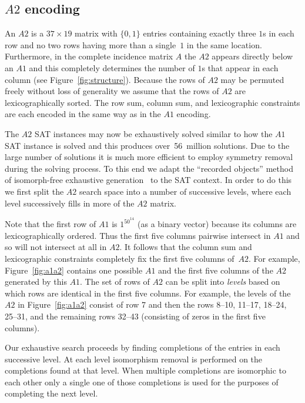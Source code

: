 \documentclass[letterpaper]{article}
\begin{document}
\subsection{\boldmath$A2$ encoding}\label{subsec:a2}

An $A2$ is a $37\times19$ matrix with $\{0,1\}$ entries containing exactly
three $1$s in each row and no two rows having more than
a single~$1$ in the same location.  Furthermore, in the complete incidence matrix $A$ the $A2$ appears
directly below an $A1$ and this completely determines the number of $1$s
that appear in each column (see Figure~\ref{fig:structure}).
Because the rows of $A2$ may be permuted freely without loss of generality
we assume that the rows of $A2$ are lexicographically sorted.
The row sum, column sum, and lexicographic constraints are each encoded
in the same way as in the $A1$ encoding.

The $A2$ SAT instances may now be exhaustively solved
similar to how the $A1$ SAT instance is solved and this
produces over~56~million solutions.
Due to the large number of solutions
it is much more efficient to employ symmetry removal
during the solving process.  To this end we adapt the ``recorded
objects'' method of isomorph-free exhaustive
generation~\cite{kaski2006classification} to the SAT context.
In order to do this we first split the $A2$ search space into a number
of successive levels, where each level successively fills in
more of the $A2$ matrix.

Note that the first row of $A1$ is $1^50^{14}$ (as a binary vector)
because its columns are lexicographically ordered.
Thus the first five columns pairwise intersect in $A1$ and
so will not intersect at all in $A2$.  It follows that the column sum
and lexicographic constraints completely fix the first five columns
of~$A2$.  For example, Figure~\ref{fig:a1a2} contains one possible
$A1$ and the first five columns of the $A2$ generated by this $A1$.
The set of rows of $A2$ can be split into \emph{levels} based on
which rows are identical in the first five columns.  For example, the levels
of the $A2$ in Figure~\ref{fig:a1a2} consist of row 7 and then
the rows 8--10, 11--17, 18--24, 25--31, and the remaining rows 32--43
(consisting of zeros in the first five columns).

Our exhaustive search proceeds by finding completions of the entries
in each successive level.  At each level isomorphism removal is performed on the
completions found at that level.
When multiple completions are isomorphic to each
other only a single one of those completions is used
for the purposes of completing the next level.
\end{document}
